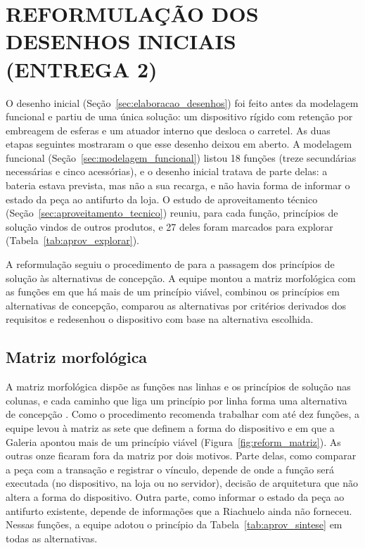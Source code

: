 \section{REFORMULAÇÃO DOS DESENHOS INICIAIS (ENTREGA 2)}\label{sec:reformulacao_desenhos}

O desenho inicial (Seção~\ref{sec:elaboracao_desenhos}) foi feito antes da modelagem funcional e partiu de uma única solução: um dispositivo rígido com retenção por embreagem de esferas e um atuador interno que desloca o carretel. As duas etapas seguintes mostraram o que esse desenho deixou em aberto. A modelagem funcional (Seção~\ref{sec:modelagem_funcional}) listou 18 funções (treze secundárias necessárias e cinco acessórias), e o desenho inicial tratava de parte delas: a bateria estava prevista, mas não a sua recarga, e não havia forma de informar o estado da peça ao antifurto da loja. O estudo de aproveitamento técnico (Seção~\ref{sec:aproveitamento_tecnico}) reuniu, para cada função, princípios de solução vindos de outros produtos, e 27 deles foram marcados para explorar (Tabela~\ref{tab:aprov_explorar}).

A reformulação seguiu o procedimento de  para a passagem dos princípios de solução às alternativas de concepção. A equipe montou a matriz morfológica com as funções em que há mais de um princípio viável, combinou os princípios em alternativas de concepção, comparou as alternativas por critérios derivados dos requisitos e redesenhou o dispositivo com base na alternativa escolhida.
\subsection{Matriz morfológica}
\label{subsec:reform_matriz}

A matriz morfológica dispõe as funções nas linhas e os princípios de solução nas colunas, e cada caminho que liga um princípio por linha forma uma alternativa de concepção \cite{rozenfeld2006gestao}. Como o procedimento recomenda trabalhar com até dez funções, a equipe levou à matriz as sete que definem a forma do dispositivo e em que a Galeria apontou mais de um princípio viável (Figura~\ref{fig:reform_matriz}). As outras onze ficaram fora da matriz por dois motivos. Parte delas, como comparar a peça com a transação e registrar o vínculo, depende de onde a função será executada (no dispositivo, na loja ou no servidor), decisão de arquitetura que não altera a forma do dispositivo. Outra parte, como informar o estado da peça ao antifurto existente, depende de informações que a Riachuelo ainda não forneceu. Nessas funções, a equipe adotou o princípio da Tabela~\ref{tab:aprov_sintese} em todas as alternativas.

